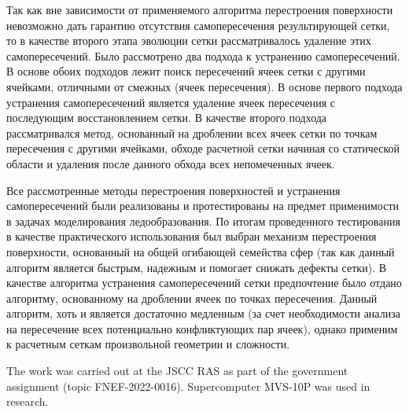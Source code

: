 \documentclass[
11pt,%
tightenlines,%
twoside,%
onecolumn,%
nofloats,%
nobibnotes,%
nofootinbib,%
superscriptaddress,%
noshowpacs,%
centertags]%
{revtex4}
\begin{document}
Так как вне зависимости от применяемого алгоритма перестроения поверхности невозможно дать гарантию отсутствия самопересечения результирующей сетки, то в качестве второго этапа эволюции сетки рассматривалось удаление этих самопересечений.
Было рассмотрено два подхода к устранению самопересечений.
В основе обоих подходов лежит поиск пересечений ячеек сетки с другими ячейками, отличными от смежных (ячеек пересечения).
В основе первого подхода устранения самопересечений является удаление ячеек пересечения с последующим восстановлением сетки.
В качестве второго подхода рассматривался метод, основанный на дроблении всех ячеек сетки по точкам пересечения с другими ячейками, обходе расчетной сетки начиная со статической области и удаления после данного обхода всех непомеченных ячеек.

Все рассмотренные методы перестроения поверхностей и устранения самопересечений были реализованы и протестированы на предмет применимости в задачах моделирования ледообразования.
По итогам проведенного тестирования в качестве практического использования был выбран механизм перестроения поверхности, основанный на общей огибающей семейства сфер (так как данный алгоритм является быстрым, надежным и помогает снижать дефекты сетки).
В качестве алгоритма устранения самопересечений сетки предпочтение было отдано алгоритму, основанному на дроблении ячеек по точках пересечения.
Данный алгоритм, хоть и является достаточно медленным (за счет необходимости анализа на пересечение всех потенциально конфликтующих пар ячеек), однако применим к расчетным сеткам произвольной геометрии и сложности.

\begin{acknowledgments}
The work was carried out at the JSCC RAS as part of the government assignment (topic FNEF-2022-0016). Supercomputer MVS-10P was used in research.
\end{acknowledgments}

\end{document}
